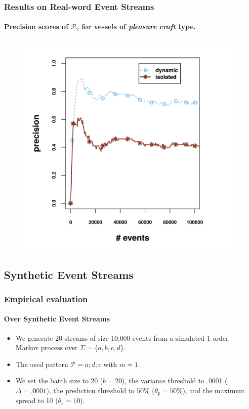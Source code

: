\begin{frame}
	
	\frametitle{Results on Real-word Event Streams }
	\framesubtitle{Precision scores of $\mathcal{P}_2$  for vessels of \textit{pleasure craft} type.}
	
\begin{figure}[]
	\centering
	\includegraphics[width=.9\textwidth,height=.8\textheight]{../chapters/figures/synopses/new/precision_p2.png}
	
\end{figure}
	
\end{frame}



\subsection{Synthetic Event Streams}
\begin{frame}
	
	\frametitle{Empirical evaluation }
	\framesubtitle{Over Synthetic Event Streams}
	\begin{itemize}
		\item<1-> We generate $20$ streams of size 10,000 events from a simulated 1-order Markov process over $\Sigma=\{a, b, c, d\}$.
		
		\item<1->The used pattern $\mathcal{P}=a ; d ; c$ with $m=1$.
		
		\item<1-> We set the batch size to 20 ($b=20$), the variance threshold to .0001 ($\Delta=.0001$), the  \pmcmr prediction threshold to $50\%$ ($\theta_{p}=50\%$), and the maximum spread to 10 ($\theta_{s}=10$).
	\end{itemize}
	
\end{frame}


